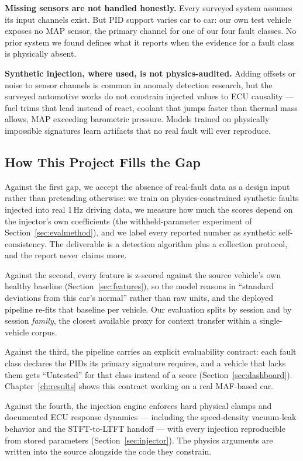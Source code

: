 \textbf{Missing sensors are not handled honestly.} Every surveyed system
assumes its input channels exist. But PID support varies car to car: our
own test vehicle exposes no MAP sensor, the primary channel for one of our
four fault classes. No prior system we found defines what it reports when
the evidence for a fault class is physically absent.

\textbf{Synthetic injection, where used, is not physics-audited.} Adding
offsets or noise to sensor channels is common in anomaly detection
research, but the surveyed automotive works do not constrain injected
values to ECU causality --- fuel trims that lead instead of react, coolant
that jumps faster than thermal mass allows, MAP exceeding barometric
pressure. Models trained on physically impossible signatures learn
artifacts that no real fault will ever reproduce.

\subsection{How This Project Fills the Gap}

Against the first gap, we accept the absence of real-fault data as a design
input rather than pretending otherwise: we train on physics-constrained
synthetic faults injected into real 1\,Hz driving data, we measure how much
the scores depend on the injector's own coefficients (the withheld-parameter
experiment of Section~\ref{sec:evalmethod}), and we label every reported
number as synthetic self-consistency. The deliverable is a detection
algorithm plus a collection protocol, and the report never claims more.

Against the second, every feature is z-scored against the source vehicle's
own healthy baseline (Section~\ref{sec:features}), so the model reasons in
``standard deviations from this car's normal'' rather than raw units, and
the deployed pipeline re-fits that baseline per vehicle. Our evaluation
splits by session and by session \emph{family}, the closest available proxy
for context transfer within a single-vehicle corpus.

Against the third, the pipeline carries an explicit evaluability contract:
each fault class declares the PIDs its primary signature requires, and a
vehicle that lacks them gets ``Untested'' for that class instead of a score
(Section~\ref{sec:dashboard}). Chapter~\ref{ch:results} shows this contract
working on a real MAF-based car.

Against the fourth, the injection engine enforces hard physical clamps and
documented ECU response dynamics --- including the speed-density vacuum-leak
behavior and the STFT-to-LTFT handoff --- with every injection reproducible
from stored parameters (Section~\ref{sec:injector}). The physics arguments
are written into the source alongside the code they constrain.
